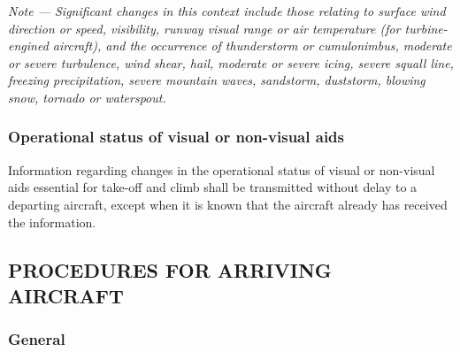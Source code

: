 \documentclass[../main.tex]{subfiles}
\begin{document}
    \textit{Note --- Significant changes in this context include those relating to surface wind direction or speed, visibility, runway visual range or air temperature (for turbine-engined aircraft), and the occurrence of thunderstorm or cumulonimbus, moderate or severe turbulence, wind shear, hail, moderate or severe icing, severe squall line, freezing precipitation, severe mountain waves, sandstorm, duststorm, blowing snow, tornado or waterspout.}

    \subsubsection{Operational status of visual or non-visual aids}

    Information regarding changes in the operational status of visual or non-visual aids essential for take-off and climb shall be transmitted without delay to a departing aircraft, except when it is known that the aircraft already has received the information.

    \subsection[Procedures for arriving aircraft]{PROCEDURES FOR ARRIVING AIRCRAFT}

    \subsubsection{General}
\end{document}
